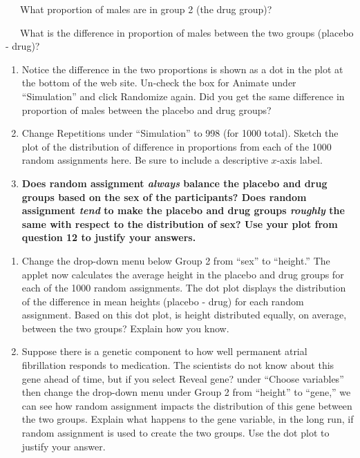 \documentclass[
]{report}
\begin{document}
\vspace{0.1in}

~~~What proportion of males are in group 2 (the drug group)?

\vspace{0.1in}

~~~What is the difference in proportion of males between the two groups (placebo - drug)?

\vspace{0.1in}

\begin{enumerate}
\def\labelenumi{\arabic{enumi}.}
\setcounter{enumi}{10}
\item
  Notice the difference in the two proportions is shown as a dot in the plot at the bottom of the web site. Un-check the box for Animate under ``Simulation'' and click Randomize again. Did you get the same difference in proportion of males between the placebo and drug groups?
  \vspace{0.25in}
\item
  Change Repetitions under ``Simulation'' to 998 (for 1000 total). Sketch the plot of the distribution of difference in proportions from each of the 1000 random assignments here. Be sure to include a descriptive \(x\)-axis label.
  \vspace{1.25in}
\item
  \textbf{Does random assignment \emph{always} balance the placebo and drug groups based on the sex of the participants? Does random assignment \emph{tend} to make the placebo and drug groups \emph{roughly} the same with respect to the distribution of sex? Use your plot from question 12 to justify your answers.}
  \vspace{0.5in}
\end{enumerate}

\newpage

\begin{enumerate}
\def\labelenumi{\arabic{enumi}.}
\setcounter{enumi}{13}
\item
  Change the drop-down menu below Group 2 from ``sex'' to ``height.'' The applet now calculates the average height in the placebo and drug groups for each of the 1000 random assignments. The dot plot displays the distribution of the difference in mean heights (placebo - drug) for each random assignment. Based on this dot plot, is height distributed equally, on average, between the two groups? Explain how you know.
  \vspace{0.5in}
\item
  Suppose there is a genetic component to how well permanent atrial fibrillation responds to medication. The scientists do not know about this gene ahead of time, but if you select Reveal gene? under ``Choose variables'' then change the drop-down menu under Group 2 from ``height'' to ``gene,'' we can see how random assignment impacts the distribution of this gene between the two groups. Explain what happens to the gene variable, in the long run, if random assignment is used to create the two groups. Use the dot plot to justify your answer.
  \vspace{0.5in}
\end{enumerate}
\end{document}
